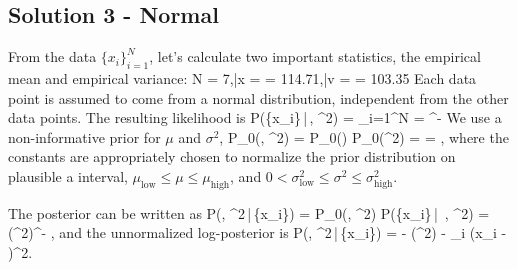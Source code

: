 \documentclass[10pt,oneside]{article}
\begin{document}
\newpage
\subsection*{Solution 3 - Normal}
From the data $\{x_i\}_{i=1}^N$, let's calculate two important statistics, the empirical mean and empirical variance:
\be
	N = 7,\qquad \bar x =  = 114.71,\qquad \bar v =  = 103.35
\ee
Each data point is assumed to come from a normal distribution, independent from the other data points. The resulting likelihood is 
\be
	P(\{x_i\}\,|\,\mu, \sigma^2) = \prod_{i=1}^N  \exp{} = \left[2\pi \sigma^2\right]^{-} \exp\left[-\frac{1}{2\sigma^2}\sum_{i=1}^N (x_i - \mu)^2\right]
\ee
We use a non-informative prior for $\mu$ and $\sigma^2$,
\be
	P_0(\mu, \sigma^2) = P_0(\mu) \times P_0(\sigma^2) =  \times {} = ,
\ee
where the constants are appropriately chosen to normalize the prior distribution on plausible a interval, $\mu_\text{low} \leq \mu \leq \mu_\text{high}$, and $0 < \sigma^2_\text{low} \leq \sigma^2 \leq \sigma^2_\text{high}$.

The posterior can be written as 
\be
	P(\mu, \sigma^2\,|\,\{x_i\}) =  \times P_0(\mu, \sigma^2) \times P(\{x_i\}\,|\, \mu, \sigma^2) =  (\sigma^2)^{-} \exp\left[-\frac{1}{2\sigma^2}\sum_{i=1}^N (x_i - \mu)^2\right],
\ee
and the unnormalized log-posterior is
\be
	\log \tilde P(\mu, \sigma^2\,|\,\{x_i\}) = - \log(\sigma^2) -  \sum_i (x_i - \mu)^2.
\ee
\end{document}

